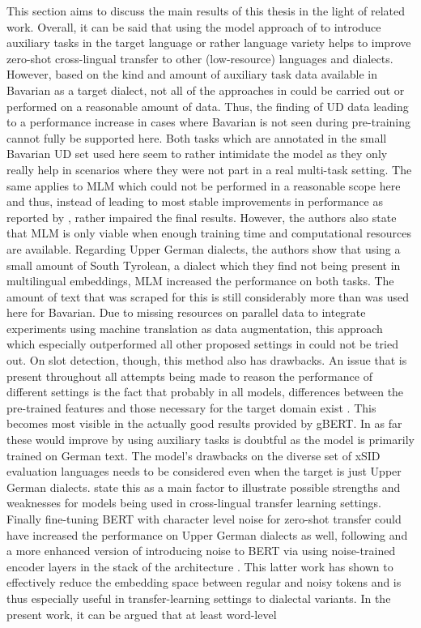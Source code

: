 \documentclass[11pt,a4paper,twoside,openright]{scrbook}
\begin{document}
This section aims to discuss the main results of this thesis in the light of related work. Overall, it can be said that using the model approach of \citet{van-der-goot-etal-2021-masked} to introduce auxiliary tasks in the target language or rather language variety helps to improve zero-shot cross-lingual transfer to other (low-resource) languages and dialects. However, based on the kind and amount of auxiliary task data available in Bavarian as a target dialect, not all of the approaches in \citet{van-der-goot-etal-2021-masked} could be carried out or performed on a reasonable amount of data. Thus, the finding of UD data leading to a performance increase in cases where Bavarian is not seen during pre-training cannot fully be supported here. Both tasks which are annotated in the small Bavarian UD set used here seem to rather intimidate the model as they only really help in scenarios where they were not part in a real multi-task setting. The same applies to MLM which could not be performed in a reasonable scope here and thus, instead of leading to most stable improvements in performance as reported by \citet{van-der-goot-etal-2021-masked}, rather impaired the final results. However, the authors also state that MLM is only viable when enough training time and computational resources are available. Regarding Upper German dialects, the authors show that using a small amount of South Tyrolean, a dialect which they find not being present in multilingual embeddings, MLM increased the performance on both tasks. The amount of text that was scraped for this is still considerably more than was used here for Bavarian. Due to missing resources on parallel data to integrate experiments using machine translation as data augmentation, this approach which especially outperformed all other proposed settings in \citet{van-der-goot-etal-2021-masked} could not be tried out. On slot detection, though, this method also has drawbacks. An issue that is present throughout all attempts being made to reason the performance of different settings is the fact that probably in all models, differences between the pre-trained features and those necessary for the target domain exist \citep{hedderich-etal-2021-survey}. This becomes most visible in the actually good results provided by gBERT. In as far these would improve by using auxiliary tasks is doubtful as the model is primarily trained on German text. The model's drawbacks on the diverse set of xSID evaluation languages needs to be considered even when the target is just Upper German dialects. \citet{xu-etal-2020-end} state this as a main factor to illustrate possible strengths and weaknesses for models being used in cross-lingual transfer learning settings. Finally fine-tuning BERT with character level noise for zero-shot transfer could have increased the performance on Upper German dialects as well, following \citet{srivastava-chiang-2023-fine} and a more enhanced version of introducing noise to BERT via using noise-trained encoder layers in the stack of the architecture \citep{srivastava-chiang-2023-bertwich}. This latter work has shown to effectively reduce the embedding space between regular and noisy tokens and is thus especially useful in transfer-learning settings to dialectal variants. In the present work, it can be argued that at least word-level 
\end{document}
